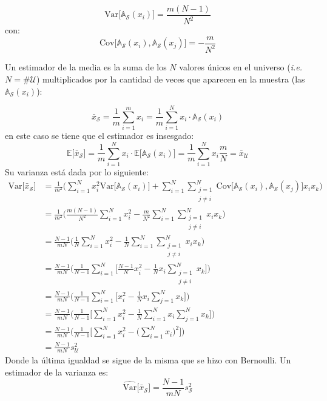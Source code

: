 \documentclass[
]{book}
\begin{document}
\[
\textrm{Var}\Big[\mathbb{A}_{\mathcal{S}}(x_i) \Big] = \dfrac{m(N-1)}{N^2}
\]
con:
\[
\textrm{Cov}\Big[\mathbb{A}_{\mathcal{S}}(x_i) ,\mathbb{A}_{\mathcal{S}}(x_j) \Big] = -\dfrac{m}{N^2}
\]

Un estimador de la media es la suma de los \(N\) valores únicos en el universo (\emph{i.e.} \(N = \# \mathcal{U}\)) multiplicados por la cantidad de veces que aparecen en la muestra (las \(\mathbb{A}_{\mathcal{S}}(x_i)\)):

\[
\bar{x}_{\mathcal{S}} = \frac{1}{m} \sum\limits_{i = 1}^m x_i = \frac{1}{m} \sum\limits_{i = 1}^N x_i\cdot \mathbb{A}_{\mathcal{S}}(x_i)
\]
en este caso se tiene que el estimador es insesgado:
\[
\mathbb{E}\Big[\bar{x}_{\mathcal{S}}\Big] =  \frac{1}{m} \sum\limits_{i = 1}^N x_i\cdot \mathbb{E}\Big[ \mathbb{A}_{\mathcal{S}}(x_i)\Big] = \frac{1}{m}\sum\limits_{i = 1}^N x_i \dfrac{m}{N}= \bar{x}_{\mathcal{U}} 
\]
Su varianza está dada por lo siguiente:
\begin{align*}
\textrm{Var}\Big[\bar{x}_{\mathcal{S}}\Big] & = \frac{1}{m^2}\bigg( \sum\limits_{i = 1}^N x_i^2\text{Var}\Big[ \mathbb{A}_{\mathcal{S}}(x_i)\Big] + \sum\limits_{i= 1}^N \sum\limits_{\substack{j = 1 \\ j \neq i}}^N \textrm{Cov}\Big[\mathbb{A}_{\mathcal{S}}(x_i) ,\mathbb{A}_{\mathcal{S}}(x_j) \Big]  x_i x_k\bigg) 
\\ & = \frac{1}{m^2}\bigg( \frac{m(N-1)}{N^2} \sum\limits_{i = 1}^N x_i^2  - \frac{m}{N^2} \sum\limits_{i= 1}^N \sum\limits_{\substack{j = 1 \\ j \neq i}}^N x_i x_k\bigg)
\\ & = \frac{N-1}{mN}\bigg( \frac{1}{N} \sum\limits_{i = 1}^N x_i^2  - \frac{1}{N} \sum\limits_{i= 1}^N \sum\limits_{\substack{j = 1 \\ j \neq i}}^N x_i x_k\bigg)
\\ & = \frac{N-1}{mN}\Bigg( \frac{1}{N-1} \sum\limits_{i = 1}^N \bigg[ \frac{N-1}{N} x_i^2  - \frac{1}{N} x_i \sum\limits_{\substack{j = 1 \\ j \neq i}}^N x_k\bigg]\Bigg)
\\ & = \frac{N-1}{mN}\Bigg( \frac{1}{N-1} \sum\limits_{i = 1}^N \bigg[  x_i^2  - \frac{1}{N} x_i \sum\limits_{j = 1}^N x_k\bigg]\Bigg)
\\ & = \frac{N-1}{mN}\Bigg( \frac{1}{N-1} \bigg[  \sum\limits_{i = 1}^N  x_i^2  - \frac{1}{N}\sum\limits_{i = 1}^N  x_i \sum\limits_{j = 1}^N x_k\bigg]\Bigg)
\\ & = \frac{N-1}{mN}\Bigg( \frac{1}{N-1} \bigg[  \sum\limits_{i = 1}^N  x_i^2  - \Big(\sum\limits_{i = 1}^N  x_i\Big)^2\bigg]\Bigg)
\\ & = \frac{N-1}{mN} s^2_{\mathcal{U}}
\end{align*}
Donde la última igualdad se sigue de la misma que se hizo con Bernoulli.
Un estimador de la varianza es:
\[
\widehat{\textrm{Var}}\Big[\bar{x}_{\mathcal{S}}\Big] = \frac{N-1}{mN} s^2_{\mathcal{S}}
\]
\end{document}
